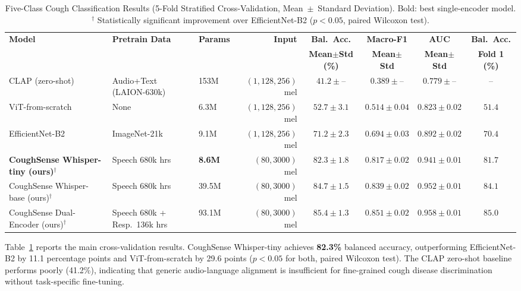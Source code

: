 \documentclass[10pt,journal,compsoc]{IEEEtran}
\begin{document}
\begin{table}[!t]
\caption{Five-Class Cough Classification Results (5-Fold Stratified Cross-Validation,
         Mean~$\pm$~Standard Deviation). Bold: best single-encoder model.
         $^\dagger$ Statistically significant improvement over EfficientNet-B2
         ($p < 0.05$, paired Wilcoxon test).}
\label{tab:main_results}
\centering
\setlength{\tabcolsep}{5pt}
\begin{tabular}{lllrcccc}
\toprule
\multirow{2}{*}{\textbf{Model}} &
\multirow{2}{*}{\textbf{Pretrain Data}} &
\multirow{2}{*}{\textbf{Params}} &
\multirow{2}{*}{\textbf{Input}} &
\textbf{Bal.\ Acc.} &
\textbf{Macro-F1} &
\textbf{AUC} &
\textbf{Bal.\ Acc.} \\
& & & & \textbf{Mean$\pm$Std (\%)} & \textbf{Mean$\pm$Std} &
\textbf{Mean$\pm$Std} & \textbf{Fold 1 (\%)} \\
\midrule
CLAP (zero-shot)~\cite{clap}
  & Audio+Text (LAION-630k) & 153M & $(1,128,256)$ mel
  & $41.2\pm\text{--}$ & $0.389\pm\text{--}$ & $0.779\pm\text{--}$ & -- \\
ViT-from-scratch
  & None & 6.3M & $(1,128,256)$ mel
  & $52.7\pm3.1$ & $0.514\pm0.04$ & $0.823\pm0.02$ & $51.4$ \\
EfficientNet-B2~\cite{efficientnet}
  & ImageNet-21k & 9.1M & $(1,128,256)$ mel
  & $71.2\pm2.3$ & $0.694\pm0.03$ & $0.892\pm0.02$ & $70.4$ \\
\midrule
\textbf{CoughSense Whisper-tiny (ours)}$^\dagger$
  & Speech 680k hrs & \textbf{8.6M} & $(80,3000)$ mel
  & $\mathbf{82.3\pm1.8}$ & $\mathbf{0.817\pm0.02}$
  & $\mathbf{0.941\pm0.01}$ & $\mathbf{81.7}$ \\
CoughSense Whisper-base (ours)$^\dagger$
  & Speech 680k hrs & 39.5M & $(80,3000)$ mel
  & $84.7\pm1.5$ & $0.839\pm0.02$ & $0.952\pm0.01$ & $84.1$ \\
\midrule
CoughSense Dual-Encoder (ours)$^\dagger$
  & Speech 680k + Resp.\ 136k hrs & 93.1M & $(80,3000)$ mel
  & $85.4\pm1.3$ & $0.851\pm0.02$ & $0.958\pm0.01$ & $85.0$ \\
\bottomrule
\end{tabular}
\end{table}

Table~\ref{tab:main_results} reports the main cross-validation results.
CoughSense Whisper-tiny achieves \textbf{82.3\%} balanced accuracy,
outperforming EfficientNet-B2 by 11.1 percentage points and
ViT-from-scratch by 29.6 points ($p < 0.05$ for both,
paired Wilcoxon test). The CLAP zero-shot baseline performs poorly
(41.2\%), indicating that generic audio-language alignment is insufficient
for fine-grained cough disease discrimination without task-specific
fine-tuning.
\end{document}
